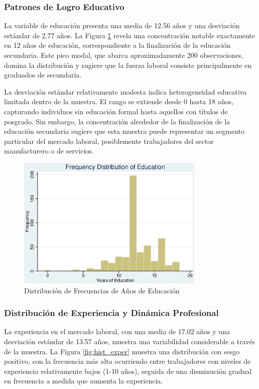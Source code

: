 \documentclass[12pt]{article}
\begin{document}
\subsubsection*{Patrones de Logro Educativo}

La variable de educación presenta una media de 12.56 años y una desviación estándar de 2.77 años. La Figura \ref{fig:hist_educ} revela una concentración notable exactamente en 12 años de educación, correspondiente a la finalización de la educación secundaria. Este pico modal, que abarca aproximadamente 200 observaciones, domina la distribución y sugiere que la fuerza laboral consiste principalmente en graduados de secundaria.

La desviación estándar relativamente modesta indica heterogeneidad educativa limitada dentro de la muestra. El rango se extiende desde 0 hasta 18 años, capturando individuos sin educación formal hasta aquellos con títulos de posgrado. Sin embargo, la concentración alrededor de la finalización de la educación secundaria sugiere que esta muestra puede representar un segmento particular del mercado laboral, posiblemente trabajadores del sector manufacturero o de servicios.

\begin{figure}[h!]
\centering
\includegraphics[width=0.8\textwidth]{Figures/0201-hist_educ.eps}
\caption{Distribución de Frecuencias de Años de Educación}
\label{fig:hist_educ}
\end{figure}

\subsubsection*{Distribución de Experiencia y Dinámica Profesional}

La experiencia en el mercado laboral, con una media de 17.02 años y una desviación estándar de 13.57 años, muestra una variabilidad considerable a través de la muestra. La Figura \ref{fig:hist_exper} muestra una distribución con sesgo positivo, con la frecuencia más alta ocurriendo entre trabajadores con niveles de experiencia relativamente bajos (1-10 años), seguida de una disminución gradual en frecuencia a medida que aumenta la experiencia.
\end{document}
